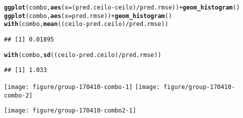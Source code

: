 \documentclass[10pt,notes=all,aspectratio=1610]{beamer}\usepackage[]{graphicx}\usepackage[]{color}
\makeatletter
\newcommand{\hlopt}[1]{\textcolor[rgb]{0,0,0}{#1}}%
\newcommand{\hlstd}[1]{\textcolor[rgb]{0.345,0.345,0.345}{#1}}%
\newcommand{\hlkwc}[1]{\textcolor[rgb]{0.333,0.667,0.333}{#1}}%
\newcommand{\hlkwd}[1]{\textcolor[rgb]{0.737,0.353,0.396}{\textbf{#1}}}%
\newenvironment{kframe}{%
 \def\at@end@of@kframe{}%
 \ifinner\ifhmode%
  \def\at@end@of@kframe{\end{minipage}}%
  \begin{minipage}{\columnwidth}%
 \fi\fi%
 \def\FrameCommand##1{\hskip\@totalleftmargin \hskip-\fboxsep
 \colorbox{shadecolor}{##1}\hskip-\fboxsep
     \hskip-\linewidth \hskip-\@totalleftmargin \hskip\columnwidth}%
 \MakeFramed {\advance\hsize-\width
   \@totalleftmargin\z@ \linewidth\hsize
   \@setminipage}}%
 {\par\unskip\endMakeFramed%
 \at@end@of@kframe}
\newenvironment{knitrout}{}{} %
\makeatother
\begin{document}
\begin{frame}[fragile]{\insertsection}
\begin{knitrout}
\color{fgcolor}\begin{kframe}
\begin{alltt}
\hlkwd{ggplot}\hlstd{(combo,} \hlkwd{aes}\hlstd{(}\hlkwc{x} \hlstd{= (pred.ceilo} \hlopt{-} \hlstd{ceilo)} \hlopt{/} \hlstd{pred.rmse))} \hlopt{+} \hlkwd{geom_histogram}\hlstd{()}
\hlkwd{ggplot}\hlstd{(combo,} \hlkwd{aes}\hlstd{(}\hlkwc{x} \hlstd{= pred.rmse))} \hlopt{+} \hlkwd{geom_histogram}\hlstd{()}
\hlkwd{with}\hlstd{(combo,} \hlkwd{mean}\hlstd{((ceilo} \hlopt{-} \hlstd{pred.ceilo)} \hlopt{/} \hlstd{pred.rmse))}
\end{alltt}
\begin{verbatim}
## [1] 0.01895
\end{verbatim}
\begin{alltt}
\hlkwd{with}\hlstd{(combo,} \hlkwd{sd}\hlstd{((ceilo} \hlopt{-} \hlstd{pred.ceilo)} \hlopt{/} \hlstd{pred.rmse))}
\end{alltt}
\begin{verbatim}
## [1] 1.033
\end{verbatim}
\end{kframe}

{\centering \texttt{[image: figure/group-170410-combo-1]} 
\texttt{[image: figure/group-170410-combo-2]} 

}



\end{knitrout}
\end{frame}

\begin{frame}[fragile]{\insertsection}
\begin{knitrout}
\color{fgcolor}

{\centering \texttt{[image: figure/group-170410-combo2-1]} 

}



\end{knitrout}
\end{frame}
\end{document}

